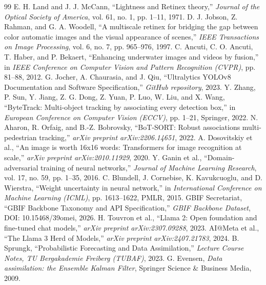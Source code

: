 \documentclass[11pt,a4paper]{article}
\begin{document}
\begin{thebibliography}{99}
 E. H. Land and J. J. McCann, ``Lightness and Retinex theory,'' \textit{Journal of the Optical Society of America}, vol. 61, no. 1, pp. 1--11, 1971.
 D. J. Jobson, Z. Rahman, and G. A. Woodell, ``A multiscale retinex for bridging the gap between color automatic images and the visual appearance of scenes,'' \textit{IEEE Transactions on Image Processing}, vol. 6, no. 7, pp. 965--976, 1997.
 C. Ancuti, C. O. Ancuti, T. Haber, and P. Bekaert, ``Enhancing underwater images and videos by fusion,'' in \textit{IEEE Conference on Computer Vision and Pattern Recognition (CVPR)}, pp. 81--88, 2012.
 G. Jocher, A. Chaurasia, and J. Qiu, ``Ultralytics YOLOv8 Documentation and Software Specification,'' \textit{GitHub repository}, 2023.
 Y. Zhang, P. Sun, Y. Jiang, Z. G. Dong, Z. Yuan, P. Luo, W. Liu, and X. Wang, ``ByteTrack: Multi-object tracking by associating every detection box,'' in \textit{European Conference on Computer Vision (ECCV)}, pp. 1--21, Springer, 2022.
 N. Aharon, R. Orfaig, and B.-Z. Bobrovsky, ``BoT-SORT: Robust associations multi-pedestrian tracking,'' \textit{arXiv preprint arXiv:2206.14651}, 2022.
 A. Dosovitskiy et al., ``An image is worth 16x16 words: Transformers for image recognition at scale,'' \textit{arXiv preprint arXiv:2010.11929}, 2020.
 Y. Ganin et al., ``Domain-adversarial training of neural networks,'' \textit{Journal of Machine Learning Research}, vol. 17, no. 59, pp. 1--35, 2016.
 C. Blundell, J. Cornebise, K. Kavukcuoglu, and D. Wierstra, ``Weight uncertainty in neural network,'' in \textit{International Conference on Machine Learning (ICML)}, pp. 1613--1622, PMLR, 2015.
 GBIF Secretariat, ``GBIF Backbone Taxonomy and API Specification,'' \textit{GBIF Backbone Dataset}, DOI: 10.15468/39omei, 2026.
 H. Touvron et al., ``Llama 2: Open foundation and fine-tuned chat models,'' \textit{arXiv preprint arXiv:2307.09288}, 2023.
 AI@Meta et al., ``The Llama 3 Herd of Models,'' \textit{arXiv preprint arXiv:2407.21783}, 2024.
 B. Sprungk, ``Probabilistic Forecasting and Data Assimilation,'' \textit{Lecture Course Notes, TU Bergakademie Freiberg (TUBAF)}, 2023.
 G. Evensen, \textit{Data assimilation: the Ensemble Kalman Filter}, Springer Science \& Business Media, 2009.
\end{thebibliography}
\end{document}
